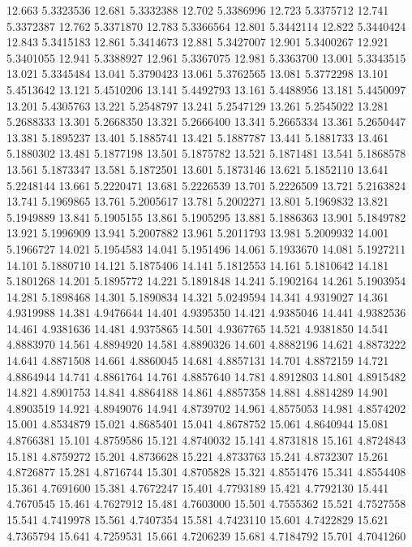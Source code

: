 12.663 5.3323536
12.681 5.3332388
12.702 5.3386996
12.723 5.3375712
12.741 5.3372387
12.762 5.3371870
12.783 5.3366564
12.801 5.3442114
12.822 5.3440424
12.843 5.3415183
12.861 5.3414673
12.881 5.3427007
12.901 5.3400267
12.921 5.3401055
12.941 5.3388927
12.961 5.3367075
12.981 5.3363700
13.001 5.3343515
13.021 5.3345484
13.041 5.3790423
13.061 5.3762565
13.081 5.3772298
13.101 5.4513642
13.121 5.4510206
13.141 5.4492793
13.161 5.4488956
13.181 5.4450097
13.201 5.4305763
13.221 5.2548797
13.241 5.2547129
13.261 5.2545022
13.281 5.2688333
13.301 5.2668350
13.321 5.2666400
13.341 5.2665334
13.361 5.2650447
13.381 5.1895237
13.401 5.1885741
13.421 5.1887787
13.441 5.1881733
13.461 5.1880302
13.481 5.1877198
13.501 5.1875782
13.521 5.1871481
13.541 5.1868578
13.561 5.1873347
13.581 5.1872501
13.601 5.1873146
13.621 5.1852110
13.641 5.2248144
13.661 5.2220471
13.681 5.2226539
13.701 5.2226509
13.721 5.2163824
13.741 5.1969865
13.761 5.2005617
13.781 5.2002271
13.801 5.1969832
13.821 5.1949889
13.841 5.1905155
13.861 5.1905295
13.881 5.1886363
13.901 5.1849782
13.921 5.1996909
13.941 5.2007882
13.961 5.2011793
13.981 5.2009932
14.001 5.1966727
14.021 5.1954583
14.041 5.1951496
14.061 5.1933670
14.081 5.1927211
14.101 5.1880710
14.121 5.1875406
14.141 5.1812553
14.161 5.1810642
14.181 5.1801268
14.201 5.1895772
14.221 5.1891848
14.241 5.1902164
14.261 5.1903954
14.281 5.1898468
14.301 5.1890834
14.321 5.0249594
14.341 4.9319027
14.361 4.9319988
14.381 4.9476644
14.401 4.9395350
14.421 4.9385046
14.441 4.9382536
14.461 4.9381636
14.481 4.9375865
14.501 4.9367765
14.521 4.9381850
14.541 4.8883970
14.561 4.8894920
14.581 4.8890326
14.601 4.8882196
14.621 4.8873222
14.641 4.8871508
14.661 4.8860045
14.681 4.8857131
14.701 4.8872159
14.721 4.8864944
14.741 4.8861764
14.761 4.8857640
14.781 4.8912803
14.801 4.8915482
14.821 4.8901753
14.841 4.8864188
14.861 4.8857358
14.881 4.8814289
14.901 4.8903519
14.921 4.8949076
14.941 4.8739702
14.961 4.8575053
14.981 4.8574202
15.001 4.8534879
15.021 4.8685401
15.041 4.8678752
15.061 4.8640944
15.081 4.8766381
15.101 4.8759586
15.121 4.8740032
15.141 4.8731818
15.161 4.8724843
15.181 4.8759272
15.201 4.8736628
15.221 4.8733763
15.241 4.8732307
15.261 4.8726877
15.281 4.8716744
15.301 4.8705828
15.321 4.8551476
15.341 4.8554408
15.361 4.7691600
15.381 4.7672247
15.401 4.7793189
15.421 4.7792130
15.441 4.7670545
15.461 4.7627912
15.481 4.7603000
15.501 4.7555362
15.521 4.7527558
15.541 4.7419978
15.561 4.7407354
15.581 4.7423110
15.601 4.7422829
15.621 4.7365794
15.641 4.7259531
15.661 4.7206239
15.681 4.7184792
15.701 4.7041260
